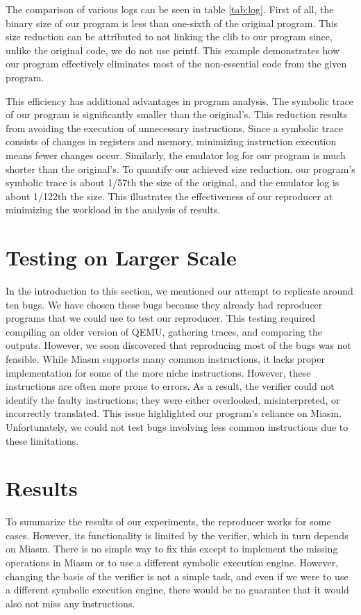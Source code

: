 The comparison of various logs can be seen in table \ref{tab:log}.
First of all, the binary size of our program is less than one-sixth of the original program.
This size reduction can be attributed to not linking the \ac{clib} to our program since, unlike the original code, we do not use printf.
This example demonstrates how our program effectively eliminates most of the non-essential code from the given program.

This efficiency has additional advantages in program analysis.
The symbolic trace of our program is significantly smaller than the original's.
This reduction results from avoiding the execution of unnecessary instructions.
Since a symbolic trace consists of changes in registers and memory, minimizing instruction execution means fewer changes occur.
Similarly, the emulator log for our program is much shorter than the original's.
To quantify our achieved size reduction, our program's symbolic trace is about 1/57th the size of the original, and the emulator log is about 1/122th the size.
This illustrates the effectiveness of our reproducer at minimizing the workload in the analysis of results.



\section{Testing on Larger Scale}
In the introduction to this section, we mentioned our attempt to replicate around ten bugs.
We have chosen these bugs because they already had reproducer programs that we could use to test our reproducer.
This testing required compiling an older version of \ac{QEMU}, gathering traces, and comparing the outputs.
However, we soon discovered that reproducing most of the bugs was not feasible.
While Miasm supports many common instructions, it lacks proper implementation for some of the more niche instructions.
However, these instructions are often more prone to errors.
As a result, the verifier could not identify the faulty instructions; they were either overlooked, misinterpreted, or incorrectly translated.
This issue highlighted our program's reliance on Miasm.
Unfortunately, we could not test bugs involving less common instructions due to these limitations.

\section{Results}
To summarize the results of our experiments, the reproducer works for some cases.
However, its functionality is limited by the verifier, which in turn depends on Miasm.
There is no simple way to fix this except to implement the missing operations in Miasm or to use a different symbolic execution engine.
However, changing the basis of the verifier is not a simple task, and even if we were to use a different symbolic execution engine, there would be no guarantee that it would also not miss any instructions.

